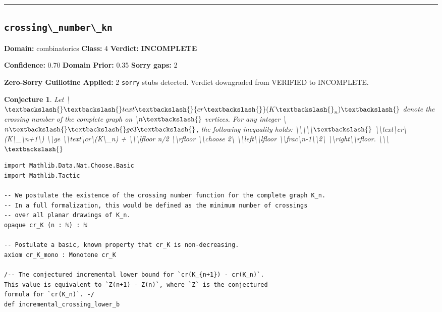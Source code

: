\documentclass[12pt,a4paper]{article}
\newtheorem{conjecture}{Conjecture}
\begin{document}
\hrule\medskip

\subsection*{\texttt{crossing\textbackslash{}_number\textbackslash{}_kn}}

\textbf{Domain:} combinatorics \quad \textbf{Class:} 4 \quad \textbf{Verdict:} \textcolor{incompleteamber}{\textbf{INCOMPLETE}}

\textbf{Confidence:} 0.70 \quad \textbf{Domain Prior:} 0.35 \quad \textbf{Sorry gaps:} 2

\textcolor{sorryred}{\textbf{Zero-Sorry Guillotine Applied:} 2 \texttt{sorry} stubs detected. Verdict downgraded from VERIFIED to INCOMPLETE.}

\begin{conjecture}
Let \textbackslash{}$\textbackslash{}\textbackslash{}text\textbackslash{}{cr\textbackslash{}}(K\textbackslash{}_n)\textbackslash{}$ denote the crossing number of the complete graph on \textbackslash{}$n\textbackslash{}$ vertices. For any integer \textbackslash{}$n \textbackslash{}\textbackslash{}ge 3\textbackslash{}$, the following inequality holds: \textbackslash{}\textbackslash{}\textbackslash{}\textbackslash{}\textbackslash{}$\textbackslash{}$ \textbackslash{}\textbackslash{}text\textbackslash{}{cr\textbackslash{}}(K\textbackslash{}_\textbackslash{}{n+1\textbackslash{}}) \textbackslash{}\textbackslash{}ge \textbackslash{}\textbackslash{}text\textbackslash{}{cr\textbackslash{}}(K\textbackslash{}_n) + \textbackslash{}{\textbackslash{}\textbackslash{}lfloor n/2 \textbackslash{}\textbackslash{}rfloor \textbackslash{}\textbackslash{}choose 2\textbackslash{}} \textbackslash{}\textbackslash{}left\textbackslash{}\textbackslash{}lfloor \textbackslash{}\textbackslash{}frac\textbackslash{}{n-1\textbackslash{}}\textbackslash{}{2\textbackslash{}} \textbackslash{}\textbackslash{}right\textbackslash{}\textbackslash{}rfloor. \textbackslash{}\textbackslash{}\textbackslash{}$\textbackslash{}$
\end{conjecture}

\begin{lstlisting}[caption={Lean 4 Sketch (v14 Galois)}]
import Mathlib.Data.Nat.Choose.Basic
import Mathlib.Tactic

-- We postulate the existence of the crossing number function for the complete graph K_n.
-- In a full formalization, this would be defined as the minimum number of crossings
-- over all planar drawings of K_n.
opaque cr_K (n : ℕ) : ℕ

-- Postulate a basic, known property that cr_K is non-decreasing.
axiom cr_K_mono : Monotone cr_K

/-- The conjectured incremental lower bound for `cr(K_{n+1}) - cr(K_n)`.
This value is equivalent to `Z(n+1) - Z(n)`, where `Z` is the conjectured
formula for `cr(K_n)`. -/
def incremental_crossing_lower_b
\end{lstlisting}
\end{document}
